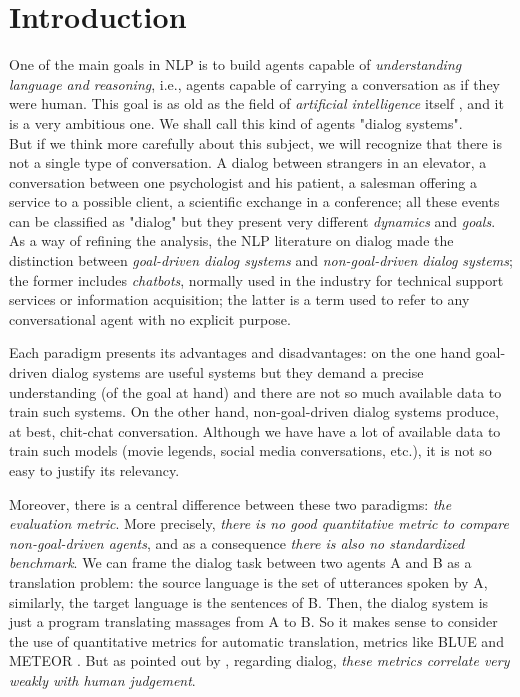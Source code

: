 \chapter{Introduction}
\label{ch:01-introduction}

One of the main goals in NLP is to build agents capable of \textit{understanding language and reasoning}, i.e., agents capable of carrying a conversation as if they were human. This goal is as old as the field of \textit{artificial intelligence} itself \cite{Turing}, and it is a very ambitious one. We shall call this kind of agents "dialog systems".\\


But if we think more carefully about this subject, we will recognize that there is not a single type of conversation. A dialog between strangers in an elevator, a conversation between one psychologist and his patient, a salesman offering a service to a possible client, a scientific exchange in a conference; all these events can be classified as "dialog" but they present very different \textit{dynamics} and \textit{goals}. As a way of refining the analysis, the NLP literature on dialog made the distinction between \textit{goal-driven dialog systems} and \textit{non-goal-driven dialog systems}; the former includes \textit{chatbots}, normally used in the industry for technical support services or information acquisition; the latter is a term used to refer to any conversational agent with no explicit purpose.

Each paradigm presents its advantages and disadvantages: on the one hand goal-driven dialog systems are useful systems but they demand a precise understanding (of the goal at hand) and there are not so much available data to train such systems. On the other hand, non-goal-driven dialog systems produce, at best, chit-chat conversation. Although we have have a lot of available data to train such models (movie legends, social media conversations, etc.), it is not so easy to justify its relevancy. 

Moreover, there is a central difference between these two paradigms: \textit{the evaluation metric}. More precisely, \textit{there is no good quantitative metric to compare non-goal-driven agents}, and as a consequence \textit{there is also no standardized benchmark}. We can frame the dialog task between two agents A and B as a translation problem: the source language is the set of utterances spoken by A, similarly, the target language is the sentences of B. Then, the dialog system is just a program translating massages from A to B. So it makes sense to consider the use of quantitative metrics for automatic translation, metrics like BLUE \cite{Papineni02bleu:a} and METEOR \cite{Lavie:2007:MAM:1626355.1626389}. But as pointed out by \cite{LiuLSNCP16, LoweSNCP16}, regarding dialog, \textit{these metrics correlate very weakly with human judgement}.

